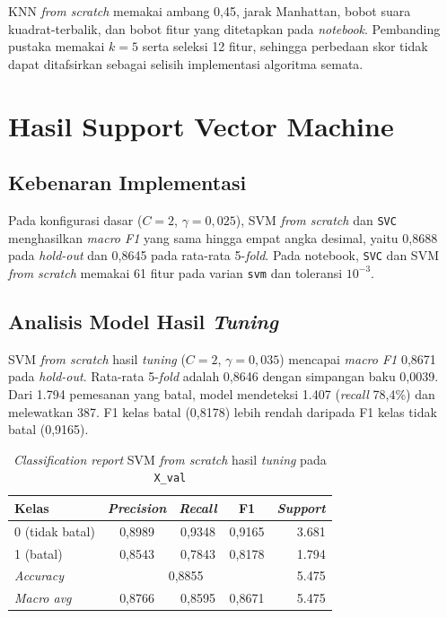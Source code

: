 KNN \textit{from scratch} memakai ambang 0,45, jarak Manhattan, bobot suara kuadrat-terbalik,
dan bobot fitur yang ditetapkan pada \textit{notebook}. Pembanding pustaka
memakai $k=5$ serta seleksi 12 fitur, sehingga perbedaan skor tidak dapat
ditafsirkan sebagai selisih implementasi algoritma semata.

\section{Hasil Support Vector Machine}

\subsection{Kebenaran Implementasi}

Pada konfigurasi dasar ($C=2$, $\gamma=0{,}025$), SVM \textit{from scratch}
dan \texttt{SVC} menghasilkan \textit{macro F1} yang sama hingga empat angka
desimal, yaitu 0,8688 pada \textit{hold-out} dan 0,8645 pada rata-rata
5-\textit{fold}. Pada notebook, \texttt{SVC} dan SVM \textit{from scratch}
memakai 61 fitur pada varian \texttt{svm} dan toleransi $10^{-3}$.

\subsection{Analisis Model Hasil \textit{Tuning}}

SVM \textit{from scratch} hasil \textit{tuning} ($C=2$, $\gamma=0{,}035$)
mencapai \textit{macro F1} 0,8671 pada \textit{hold-out}. Rata-rata
5-\textit{fold} adalah 0,8646 dengan simpangan baku 0,0039. Dari 1.794
pemesanan yang batal, model mendeteksi 1.407 (\textit{recall} 78,4\%)
dan melewatkan 387. F1 kelas batal (0,8178) lebih rendah daripada F1 kelas
tidak batal (0,9165).

\begin{table}[H]
	\centering
	\caption{\textit{Classification report} SVM \textit{from scratch} hasil \textit{tuning} pada \texttt{X\_val}}
	\label{tab:report-svm}
	\begin{tabular}{l c c c r}
		\toprule
		\textbf{Kelas} & \textbf{\textit{Precision}} & \textbf{\textit{Recall}} & \textbf{F1} & \textbf{\textit{Support}} \\
		\midrule
		0 (tidak batal) & 0,8989 & 0,9348 & 0,9165 & 3.681 \\
		1 (batal)       & 0,8543 & 0,7843 & 0,8178 & 1.794 \\
		\midrule
		\textit{Accuracy}  & \multicolumn{3}{c}{0,8855} & 5.475 \\
		\textit{Macro avg} & 0,8766 & 0,8595 & 0,8671 & 5.475 \\
		\bottomrule
	\end{tabular}
\end{table}

